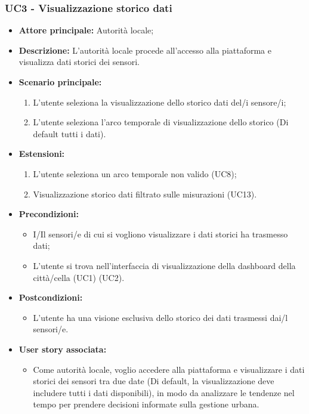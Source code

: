 \subsubsection{UC3 - Visualizzazione storico dati }

\begin{itemize}
    \item \textbf{Attore principale:} Autorità locale;
    \item \textbf{Descrizione:} L'autorità locale procede all'accesso alla piattaforma e visualizza dati storici dei sensori.
    \item \textbf{Scenario principale:}
        \begin{enumerate}
            \item L'utente seleziona la visualizzazione dello storico dati del/i sensore/i;
            \item L'utente seleziona l'arco temporale di visualizzazione dello storico (Di default tutti i dati).
        \end{enumerate}
    \item \textbf{Estensioni:}
        \begin{enumerate}
            \item L'utente seleziona un arco temporale non valido (UC8);
            \item Visualizzazione storico dati filtrato sulle misurazioni (UC13).
        \end{enumerate}
    \item \textbf{Precondizioni:}
        \begin{itemize}
            \item I/Il sensori/e di cui si vogliono visualizzare i dati storici ha trasmesso dati;
            \item L'utente si trova nell'interfaccia di visualizzazione della dashboard della città/cella  (UC1) (UC2).
        \end{itemize}
    \item \textbf{Postcondizioni:}
        \begin{itemize}
            \item  L'utente ha una visione esclusiva dello storico dei dati trasmessi  dai/l sensori/e.
        \end{itemize}
    \item \textbf{User story associata:}
        \begin{itemize}
            \item Come autorità locale, voglio accedere alla piattaforma e visualizzare i dati storici dei sensori tra due date (Di default, la visualizzazione deve includere tutti i dati disponibili), in modo da analizzare le tendenze nel tempo per prendere decisioni informate sulla gestione urbana.
        \end{itemize}
\end{itemize}